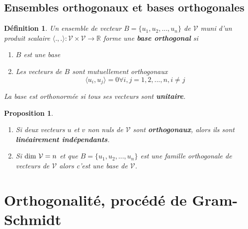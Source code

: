 \documentclass{article}[french, babel]
\newtheorem{mydef}{Définition}
\newtheorem{myprop}{Proposition}
\let\stdsection\section
\renewcommand\section{\newpage\stdsection}
\begin{document}
	\subsection{Ensembles orthogonaux et bases orthogonales}
		\begin{mydef}
			Un ensemble de vecteur $B=\{u_1,u_2,...,u_n\}$ de $\mathcal{V}$ muni d'un produit scalaire $\langle .,.\rangle:\mathcal{V}\times\mathcal{V}\longrightarrow\mathbb{R}$ forme une \textbf{base orthogonal} si 
			\begin{enumerate}
				\item $B$ est une base
				\item Les vecteurs de $B$ sont mutuellement orthogonaux\[\langle u_i,u_j\rangle=0 \forall i,j=1,2,...,n, i\neq j\]
			\end{enumerate}
		La base est orthonormée si tous ses vecteurs sont \textbf{unitaire}.
		\end{mydef}
		\begin{myprop}
			~
			\begin{enumerate}
				\item Si deux vecteurs $u$ et $v$ non nuls de $\mathcal{V}$ sont \textbf{orthogonaux}, alors ils sont \textbf{linéairement indépendants}.
				\item Si $\text{\normalfont{dim}} \ \mathcal{V}=n$ et que $B=\{u_1,u_2,...,u_n\}$ est une famille orthogonale de vecteurs de $\mathcal{V}$ alors c'est une base de $\mathcal{V}$.
			\end{enumerate}
		\end{myprop}
\section{Orthogonalité, procédé de Gram-Schmidt}
\end{document}
